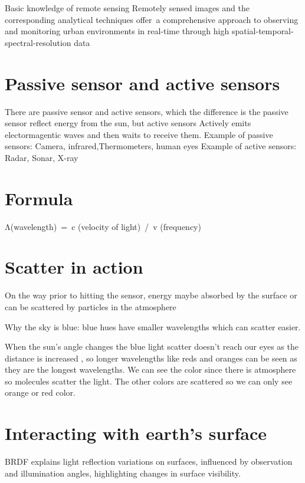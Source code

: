 \documentclass[
  letterpaper,
  DIV=11,
  numbers=noendperiod]{scrreprt}
\begin{document}
Basic knowledge of remote sensing Remotely sensed images and the
corresponding analytical techniques offer~a comprehensive approach to
observing and monitoring urban environments in real-time through high
spatial-temporal-spectral-resolution data

\section{Passive sensor and active
sensors}\label{passive-sensor-and-active-sensors}

There are passive sensor and active sensors, which the difference is the
passive sensor reflect energy from the sun, but active sensors Actively
emits electormagentic waves and then waits to receive them. Example of
passive sensors: Camera, infrared,Thermometers, human eyes Example of
active sensors: Radar, Sonar, X-ray

\section{Formula}\label{formula}

Λ(wavelength)~=~c (velocity of light)~/~v (frequency)

\section{Scatter in action}\label{scatter-in-action}

On the way prior to hitting the sensor, energy maybe absorbed by the
surface or can be scattered by particles in the atmosphere

Why the sky is blue: blue hues have smaller wavelengths which can
scatter easier.

When the sun's angle changes the blue light scatter doesn't reach our
eyes as the distance is increased , so longer wavelengths like reds and
oranges can be seen as they are the longest wavelengths. We can see the
color since there is atmosphere so molecules scatter the light. The
other colors are scattered so we can only see orange or red color.

\section{Interacting with earth's
surface}\label{interacting-with-earths-surface}

BRDF explains light reflection variations on surfaces, influenced by
observation and illumination angles, highlighting changes in surface
visibility.
\end{document}
